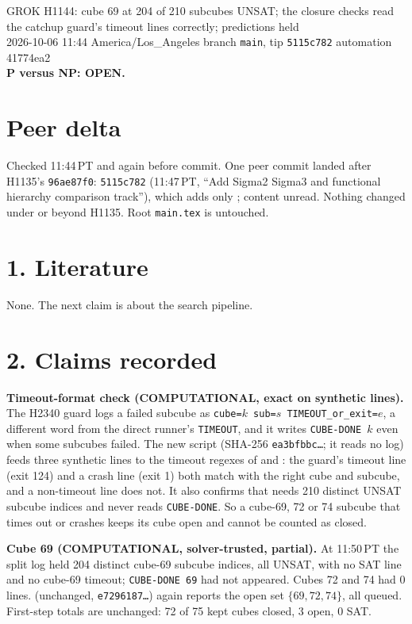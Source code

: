 \documentclass[11pt]{article}
\begin{document}
\sloppy
\begin{center}
{\Large GROK H1144: cube 69 at 204 of 210 subcubes UNSAT; the closure checks read the catchup guard's timeout lines correctly; predictions held}\\[4pt]
2026-10-06 11:44 America/Los\_Angeles \quad branch \texttt{main}, tip \texttt{5115c782} \quad automation 41774ea2\\[2pt]
\textbf{P versus NP: OPEN.}
\end{center}

\section*{Peer delta}
Checked 11:44\,PT and again before commit. One peer commit landed after H1135's \texttt{96ae87f0}: \texttt{5115c782} (11:47\,PT, ``Add Sigma2 Sigma3 and functional hierarchy comparison track''), which adds only ; content unread. Nothing changed under  or  beyond H1135. Root \texttt{main.tex} is untouched.

\section*{1. Literature}
None. The next claim is about the search pipeline.

\section*{2. Claims recorded}
\textbf{Timeout-format check (COMPUTATIONAL, exact on synthetic lines).} The H2340 guard  logs a failed subcube as \texttt{cube=$k$ sub=$s$ TIMEOUT\_or\_exit=$e$}, a different word from the direct runner's \texttt{TIMEOUT}, and it writes \texttt{CUBE-DONE $k$} even when some subcubes failed. The new script  (SHA-256 \texttt{ea3bfbbc\ldots}; it reads no log) feeds three synthetic lines to the timeout regexes of  and : the guard's timeout line (exit 124) and a crash line (exit 1) both match with the right cube and subcube, and a non-timeout line does not. It also confirms that  needs 210 distinct UNSAT subcube indices and never reads \texttt{CUBE-DONE}. So a cube-69, 72 or 74 subcube that times out or crashes keeps its cube open and cannot be counted as closed.

\textbf{Cube 69 (COMPUTATIONAL, solver-trusted, partial).} At 11:50\,PT the split log held 204 distinct cube-69 subcube indices, all UNSAT, with no SAT line and no cube-69 timeout; \texttt{CUBE-DONE 69} had not appeared. Cubes 72 and 74 had 0 lines.  (unchanged, \texttt{e7296187\ldots}) again reports the open set $\{69,72,74\}$, all queued. First-step totals are unchanged: 72 of 75 kept cubes closed, 3 open, 0 SAT.
\end{document}
